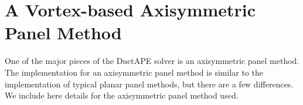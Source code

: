 \chapter{A Vortex-based Axisymmetric Panel Method}
\label{ch:panel_method}

One of the major pieces of the DuctAPE solver is an axisymmetric panel method.
The implementation for an axisymmetric panel method is similar to the implementation of typical planar panel methods, but there are a few differences.
We include here details for the axisymmetric panel method used.


%

%

%

%


